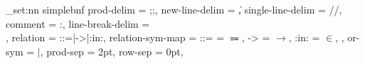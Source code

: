 \keys_set:nn { simplebnf }
  {
    prod-delim = ;;,
    new-line-delim = \|,
    single-line-delim = //,
    comment = :,
    line-break-delim = \\,
    relation = {::=|->|:in:},
    relation-sym-map =
      {
        {::=} = {\ensuremath{\Coloneqq}},
        {->} = {\ensuremath{\to}},
        {:in:} = {\ensuremath{\in}},
      },
    or-sym = $|$,
    prod-sep = 2pt,
    row-sep = 0pt,
  }
